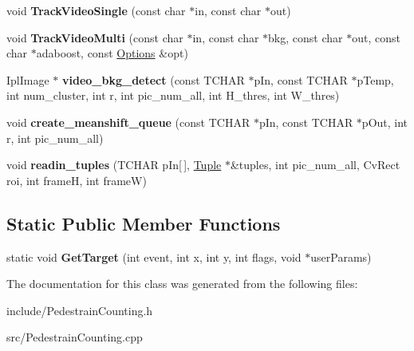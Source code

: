 \begin{DoxyCompactItemize}
\item 
\hypertarget{classPedestrainCounter_a57995949d7ee7d37e360fd83fce4f092}{}void {\bfseries Track\+Video\+Single} (const char $\ast$in, const char $\ast$out)\label{classPedestrainCounter_a57995949d7ee7d37e360fd83fce4f092}

\item 
\hypertarget{classPedestrainCounter_a675f4f6424297b0c5bb5a99a92354768}{}void {\bfseries Track\+Video\+Multi} (const char $\ast$in, const char $\ast$bkg, const char $\ast$out, const char $\ast$adaboost, const \hyperlink{structOptions}{Options} \&opt)\label{classPedestrainCounter_a675f4f6424297b0c5bb5a99a92354768}

\item 
\hypertarget{classPedestrainCounter_a74f520e3fc977f806cc1e631ba808f12}{}Ipl\+Image $\ast$ {\bfseries video\+\_\+bkg\+\_\+detect} (const T\+C\+H\+A\+R $\ast$p\+In, const T\+C\+H\+A\+R $\ast$p\+Temp, int num\+\_\+cluster, int r, int pic\+\_\+num\+\_\+all, int H\+\_\+thres, int W\+\_\+thres)\label{classPedestrainCounter_a74f520e3fc977f806cc1e631ba808f12}

\item 
\hypertarget{classPedestrainCounter_a9ca8269052d3a9fa1efefd38a9d3da00}{}void {\bfseries create\+\_\+meanshift\+\_\+queue} (const T\+C\+H\+A\+R $\ast$p\+In, const T\+C\+H\+A\+R $\ast$p\+Out, int r, int pic\+\_\+num\+\_\+all)\label{classPedestrainCounter_a9ca8269052d3a9fa1efefd38a9d3da00}

\item 
\hypertarget{classPedestrainCounter_a065e82f39586db04272a76582f31fdcc}{}void {\bfseries readin\+\_\+tuples} (T\+C\+H\+A\+R p\+In\mbox{[}$\,$\mbox{]}, \hyperlink{structTuple}{Tuple} $\ast$\&tuples, int pic\+\_\+num\+\_\+all, Cv\+Rect roi, int frame\+H, int frame\+W)\label{classPedestrainCounter_a065e82f39586db04272a76582f31fdcc}

\end{DoxyCompactItemize}
\subsection*{Static Public Member Functions}
\begin{DoxyCompactItemize}
\item 
\hypertarget{classPedestrainCounter_a7e7eeae113576d003637a9ad40ffc6bc}{}static void {\bfseries Get\+Target} (int event, int x, int y, int flags, void $\ast$user\+Params)\label{classPedestrainCounter_a7e7eeae113576d003637a9ad40ffc6bc}

\end{DoxyCompactItemize}


The documentation for this class was generated from the following files\+:\begin{DoxyCompactItemize}
\item 
include/Pedestrain\+Counting.\+h\item 
src/Pedestrain\+Counting.\+cpp\end{DoxyCompactItemize}
